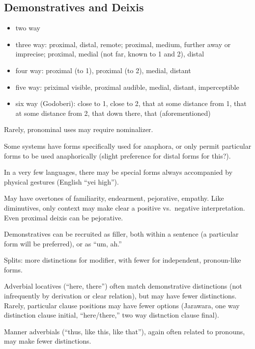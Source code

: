 \documentclass[11pt]{article}
\newenvironment{grammarlist}%
 {\begin{itemize}\addtolength{\itemsep}{-0.5\baselineskip}\ignorespaces}%
 {\end{itemize}\ignorespacesafterend}
\begin{document}
\subsection{Demonstratives and Deixis}

\begin{grammarlist}
  \item two way
  \item three way: proximal, distal, remote; proximal, medium, further
    away or imprecise; proximal, medial (not far, known to 1 and 2),
    distal
  \item four way: proximal (to 1), proximal (to 2), medial, distant
  \item five way: priximal visible, proximal audible, medial, distant,
    imperceptible
  \item six way (Godoberi): close to 1, close to 2, that at some
    distance from 1, that at some distance from 2, that down there,
    that (aforementioned)
\end{grammarlist}

Rarely, pronominal uses may require nominalizer.

Some systems have forms specifically used for anaphora, or only permit
particular forms to be used anaphorically (slight preference for
distal forms for this?).

In a very few languages, there may be special forms always accompanied
by physical gestures (English ``yei high'').

May have overtones of familiarity, endearment, pejorative,
empathy.  Like diminutives, only context may make clear a positive
vs.\ negative interpretation.  Even proximal deixis can be
pejorative. 

Demonstratives can be recruited as filler, both within a sentence (a
particular form will be preferred), or as ``um, ah.''

Splits: more distinctions for modifier, with fewer for independent,
pronoun-like forms. 

Adverbial locatives (``here, there'') often match demonstrative
distinctions (not infrequently by derivation or clear relation), but
may have fewer distinctions.  Rarely, particular clause positions may
have fewer options (Jarawara, one way distinction clause initial,
``here/there,'' two way distnction clause final).

Manner adverbials (``thus, like this, like that''), again often
related to pronouns, may make fewer distinctions.
\end{document}
